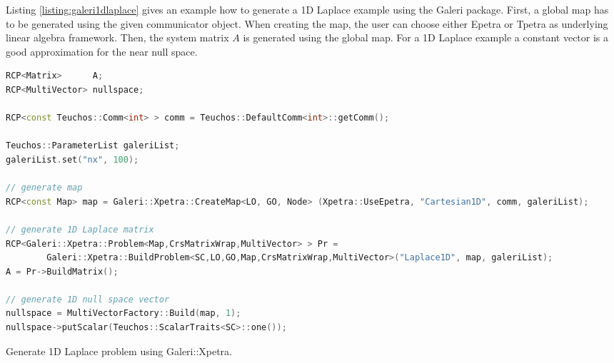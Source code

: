 Listing \ref{listing:galeri1dlaplace} gives an example how to generate a 1D Laplace example using the Galeri package. First, a global map has to be generated using the given communicator object. When creating the map, the user can choose either Epetra or Tpetra as underlying linear algebra framework. Then, the system matrix $A$ is generated using the global map. For a 1D Laplace example a constant vector is a good approximation for the near null space.
\begin{Listing}
\begin{center}
\begin{lstlisting}[language=C++,label=listing:galeri1dlaplace]
RCP<Matrix>      A;
RCP<MultiVector> nullspace;

RCP<const Teuchos::Comm<int> > comm = Teuchos::DefaultComm<int>::getComm();

Teuchos::ParameterList galeriList;
galeriList.set("nx", 100);

// generate map
RCP<const Map> map = Galeri::Xpetra::CreateMap<LO, GO, Node> (Xpetra::UseEpetra, "Cartesian1D", comm, galeriList);

// generate 1D Laplace matrix
RCP<Galeri::Xpetra::Problem<Map,CrsMatrixWrap,MultiVector> > Pr =
        Galeri::Xpetra::BuildProblem<SC,LO,GO,Map,CrsMatrixWrap,MultiVector>("Laplace1D", map, galeriList);
A = Pr->BuildMatrix();

// generate 1D null space vector
nullspace = MultiVectorFactory::Build(map, 1);
nullspace->putScalar(Teuchos::ScalarTraits<SC>::one());
\end{lstlisting}
\caption{Generate 1D Laplace problem using Galeri::Xpetra.}
\label{listing:galeri1dlaplace}
\end{center}
\end{Listing}

